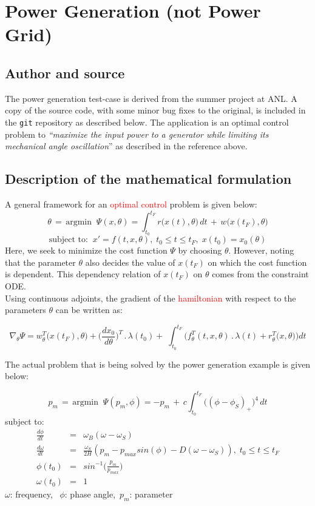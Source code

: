 \section{Power Generation (not Power Grid)}
\subsection{Author and source}
The power generation test-case is derived from the summer project \cite{Rao_2013} at ANL. A copy of the source code, with some minor bug fixes to the original, is included in the \texttt{git} repository as described below. The application is an optimal control problem to \textit{``maximize the input power to a generator while limiting its mechanical angle oscillation}'' as described in the reference above.
\subsection{Description of the mathematical formulation}\label{power_cont_adj_math}
A general framework for an \textcolor{red}{optimal control} \cite{Sandu_2012} problem is given below:
\[ \theta \,=\, \text{argmin} \;\; \Psi(x, \theta) = \int_{t_0}^{t_F} r\big(x(t), \theta\big)\, dt \,+\, w\big(x(t_F), \theta\big)\]
\[ \text{subject to:} \;\; x' = f(t, x, \theta), \; t_0 \leq t \leq t_F, \; x(t_0) = x_0(\theta) \]
Here, we seek to minimize the cost function $\Psi$ by choosing $\theta$. However, noting that the parameter $\theta$ also decides the value of $x(t_F)$ on which the cost function is dependent. This dependency relation of $x(t_F)$ on $\theta$ comes from the constraint ODE.\\

\noindent Using continuous adjoints, the gradient of the \textcolor{red}{hamiltonian} with respect to the parameters $\theta$ can be written as:

\[\nabla_{\theta} \Psi = w_{\theta}^T\big(x(t_F), \theta\big) + \bigg(\frac{d x_0}{d \theta}\bigg)^T \,.\, \lambda(t_0) +\;\int_{t_0}^{t_F} \bigg(f_{\theta}^T(t, x, \theta) \,.\, \lambda(t) + r_{\theta}^T\big(x,\theta\big)\bigg) dt\]

\noindent The actual problem that is being solved by the power generation example is given below:

\[ p_m \,=\, \text{argmin} \;\; \Psi( p_m, \phi) = - p_m \,+\, c \int_{t_0}^{t_F} \big((\phi - \phi_S)_{+}\big)^4 \, dt\]
subject to: 
\begin{eqnarray*}
\frac{d\phi}{dt} &=& \omega_B (\omega - \omega_S)\\
\frac{d\omega}{dt} &=& \frac{\omega_S}{2H} (p_m - p_{max} sin(\phi) - D(\omega - \omega_S)),\; t_0 \leq t \leq t_F \\
\phi(t_0) &=& sin^{-1}\bigg(\frac{p_m}{p_{max}}\bigg) \\
\omega(t_0) &=& 1 
\end{eqnarray*}
$\omega$: frequency, \, $\phi$: phase angle,\, $p_m$: parameter\\

